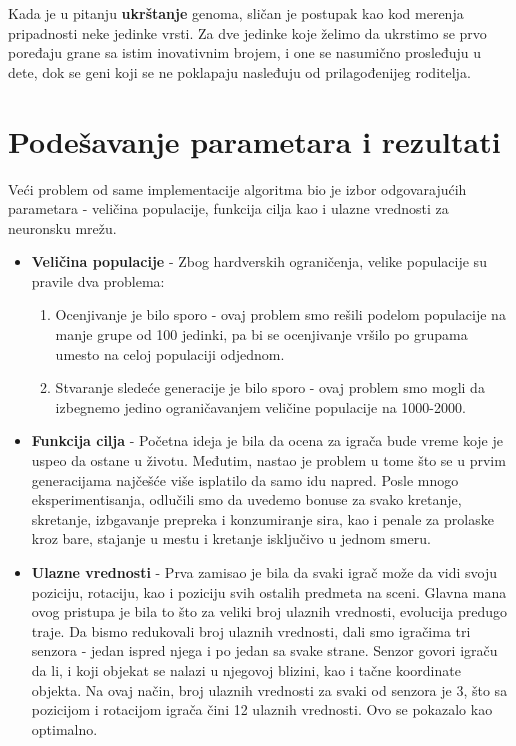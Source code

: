\documentclass[a4paper]{article}
\begin{document}
Kada je u pitanju \textbf{ukrštanje} genoma, sličan je postupak kao kod merenja pripadnosti neke jedinke vrsti. Za dve jedinke koje želimo da ukrstimo se prvo poređaju grane sa istim inovativnim brojem, i one se nasumično prosleđuju u dete, dok se geni koji se ne poklapaju nasleđuju od prilagođenijeg roditelja.

\section{Podešavanje parametara i rezultati}
\label{podesavanje}

Veći problem od same implementacije algoritma bio je izbor odgovarajućih parametara - veličina populacije, funkcija cilja kao i ulazne vrednosti za neuronsku mrežu. 

\begin{itemize}

\item \textbf{Veličina populacije} - Zbog hardverskih ograničenja, velike populacije su pravile dva problema:
\begin{enumerate}
\item Ocenjivanje je bilo sporo - ovaj problem smo rešili podelom populacije na manje grupe od 100 jedinki, pa bi se ocenjivanje vršilo po grupama umesto na celoj populaciji odjednom.
\item Stvaranje sledeće generacije je bilo sporo - ovaj problem smo mogli da izbegnemo jedino ograničavanjem veličine populacije na 1000-2000.
\end{enumerate}


\item \textbf{Funkcija cilja} - Početna ideja je bila da ocena za igrača bude vreme koje je uspeo da ostane u životu. Međutim, nastao je problem u tome što se u prvim generacijama najčešće više isplatilo da samo idu napred. Posle mnogo eksperimentisanja, odlučili smo da uvedemo bonuse za svako kretanje, skretanje, izbgavanje prepreka i konzumiranje sira, kao i penale za prolaske kroz bare, stajanje u mestu i kretanje isključivo u jednom smeru.

\item \textbf{Ulazne vrednosti} - Prva zamisao je bila da svaki igrač može da vidi svoju poziciju, rotaciju, kao i poziciju svih ostalih predmeta na sceni. Glavna mana ovog pristupa je bila to što za veliki broj ulaznih vrednosti, evolucija predugo traje. Da bismo redukovali broj ulaznih vrednosti, dali smo igračima tri senzora - jedan ispred njega i po jedan sa svake strane. Senzor govori igraču da li, i koji objekat se nalazi u njegovoj blizini, kao i tačne koordinate objekta. Na ovaj način, broj ulaznih vrednosti za svaki od senzora je 3, što sa pozicijom i rotacijom igrača čini 12 ulaznih vrednosti. Ovo se pokazalo kao optimalno.

\end{itemize}
\end{document}
